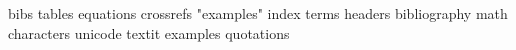 bibs
tables
equations 
crossrefs
"examples"
index terms
headers
bibliography
math characters unicode
textit examples
quotations